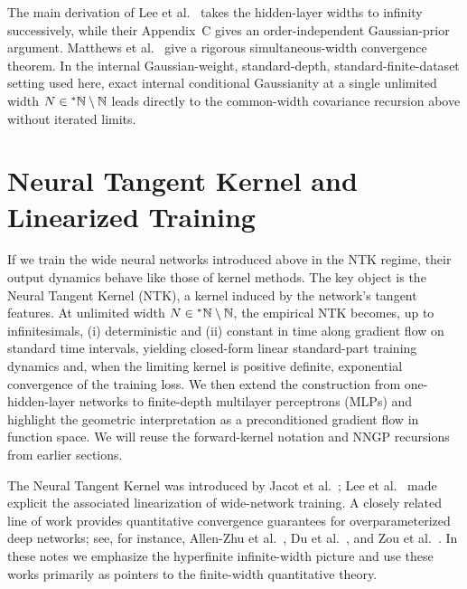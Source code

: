\begin{remark}\label{rem:ch2-seq-vs-sim}
The main derivation of Lee et al.~\cite{lee2018deep} takes the hidden-layer widths to infinity successively, while their Appendix~C gives an order-independent Gaussian-prior argument. Matthews et al.~\cite{matthews2018gaussian} give a rigorous simultaneous-width convergence theorem. In the internal Gaussian-weight, standard-depth, standard-finite-dataset setting used here, exact internal conditional Gaussianity at a single unlimited width $N \in {}^*\mathbb{N} \setminus \mathbb{N}$ leads directly to the common-width covariance recursion above without iterated limits.
\end{remark}

\section{Neural Tangent Kernel and Linearized Training}\label{sec:ch2-ntk-general}

If we train the wide neural networks introduced above in the NTK regime, their output dynamics behave like those of kernel methods. The key object is the Neural Tangent Kernel (NTK), a kernel induced by the network's tangent features. At unlimited width $N \in {}^*\mathbb{N} \setminus \mathbb{N}$, the empirical NTK becomes, up to infinitesimals, (i) deterministic and (ii) constant in time along gradient flow on standard time intervals, yielding closed-form linear standard-part training dynamics and, when the limiting kernel is positive definite, exponential convergence of the training loss. We then extend the construction from one-hidden-layer networks to finite-depth multilayer perceptrons (MLPs) and highlight the geometric interpretation as a preconditioned gradient flow in function space. We will reuse the forward-kernel notation and NNGP recursions from earlier sections.

The Neural Tangent Kernel was introduced by Jacot et al.~\cite{jacot2018neural}; Lee et al.~\cite{lee2019wide} made explicit the associated linearization of wide-network training. A closely related line of work provides quantitative convergence guarantees for overparameterized deep networks; see, for instance, Allen-Zhu et al.~\cite{allen2018convergence}, Du et al.~\cite{du2018gradient}, and Zou et al.~\cite{zou2018stochastic}. In these notes we emphasize the hyperfinite infinite-width picture and use these works primarily as pointers to the finite-width quantitative theory.

